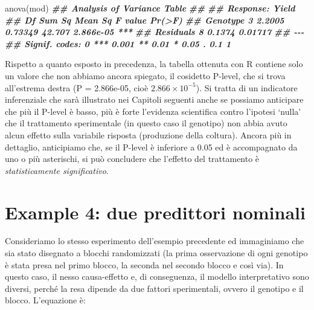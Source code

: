 \documentclass[
  12pt,
]{book}
\newenvironment{Shaded}{\begin{snugshade}}{\end{snugshade}}
\newcommand{\DocumentationTok}[1]{\textcolor[rgb]{0.56,0.35,0.01}{\textbf{\textit{#1}}}}
\newcommand{\FunctionTok}[1]{\textcolor[rgb]{0.00,0.00,0.00}{#1}}
\newcommand{\NormalTok}[1]{#1}
\begin{document}
\vspace{12pt}

\begin{Shaded}
\begin{Highlighting}[]
\FunctionTok{anova}\NormalTok{(mod)}
\DocumentationTok{\#\# Analysis of Variance Table}
\DocumentationTok{\#\# }
\DocumentationTok{\#\# Response: Yield}
\DocumentationTok{\#\#           Df Sum Sq Mean Sq F value    Pr(\textgreater{}F)    }
\DocumentationTok{\#\# Genotype   3 2.2005 0.73349  42.707 2.866e{-}05 ***}
\DocumentationTok{\#\# Residuals  8 0.1374 0.01717                      }
\DocumentationTok{\#\# {-}{-}{-}}
\DocumentationTok{\#\# Signif. codes:  0 \textquotesingle{}***\textquotesingle{} 0.001 \textquotesingle{}**\textquotesingle{} 0.01 \textquotesingle{}*\textquotesingle{} 0.05 \textquotesingle{}.\textquotesingle{} 0.1 \textquotesingle{} \textquotesingle{} 1}
\end{Highlighting}
\end{Shaded}

Rispetto a quanto esposto in precedenza, la tabella ottenuta con R contiene solo un valore che non abbiamo ancora spiegato, il cosidetto P-level, che si trova all'estrema destra (P = 2.866e-05, cioè \(2.866 \times 10^{-5}\)). Si tratta di un indicatore inferenziale che sarà illustrato nei Capitoli seguenti anche se possiamo anticipare che più il P-level è basso, più è forte l'evidenza scientifica contro l'ipotesi `nulla' che il trattamento sperimentale (in questo caso il genotipo) non abbia avuto alcun effetto sulla variabile risposta (produzione della coltura). Ancora più in dettaglio, anticipiamo che, se il P-level è inferiore a 0.05 ed è accompagnato da uno o più asterischi, si può concludere che l'effetto del trattamento è \emph{statisticamente significativo}.

\hypertarget{example-4-due-predittori-nominali}{%
\section{Example 4: due predittori nominali}\label{example-4-due-predittori-nominali}}

Consideriamo lo stesso esperimento dell'esempio precedente ed immaginiamo che sia stato disegnato a blocchi randomizzati (la prima osservazione di ogni genotipo è stata presa nel primo blocco, la seconda nel secondo blocco e così via). In questo caso, il nesso causa-effetto e, di conseguenza, il modello interpretativo sono diversi, perché la resa dipende da due fattori sperimentali, ovvero il genotipo e il blocco. L'equazione è:
\end{document}
